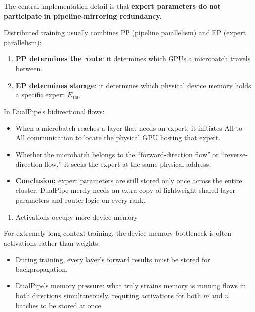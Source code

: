 The central implementation detail is that \textbf{expert parameters do not participate in pipeline-mirroring redundancy.}

Distributed training usually combines PP (pipeline parallelism) and EP (expert parallelism):

\begin{enumerate}
\def\labelenumi{\arabic{enumi}.}
\tightlist
\item
  \textbf{PP determines the route}: it determines which GPUs a microbatch travels between.
\item
  \textbf{EP determines storage}: it determines which physical device memory holds a specific expert \(E_{100}\).
\end{enumerate}

In DualPipe's bidirectional flows:

\begin{itemize}
\tightlist
\item
  When a microbatch reaches a layer that needs an expert, it initiates All-to-All communication to locate the physical GPU hosting that expert.
\item
  Whether the microbatch belongs to the ``forward-direction flow'' or ``reverse-direction flow,'' it seeks the expert at the same physical address.
\item
  \textbf{Conclusion:} expert parameters are still stored only once across the entire cluster. DualPipe merely needs an extra copy of lightweight shared-layer parameters and router logic on every rank.
\end{itemize}

\begin{enumerate}
\def\labelenumi{\arabic{enumi}.}
\setcounter{enumi}{1}
\tightlist
\item
  Activations occupy more device memory
\end{enumerate}

For extremely long-context training, the device-memory bottleneck is often activations rather than weights.

\begin{itemize}
\tightlist
\item
  During training, every layer's forward results must be stored for backpropagation.
\item
  DualPipe's memory pressure: what truly strains memory is running flows in both directions simultaneously, requiring activations for both \(m\) and \(n\) batches to be stored at once.
\end{itemize}

